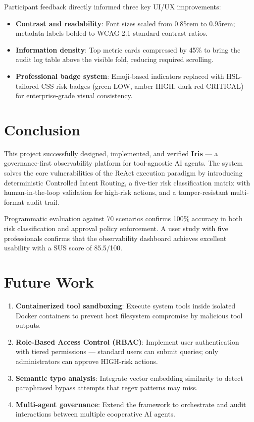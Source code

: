 Participant feedback directly informed three key UI/UX improvements:
\begin{itemize}[leftmargin=1.5em]
  \item \textbf{Contrast and readability}: Font sizes scaled from 0.85rem to 0.95rem; metadata labels bolded to WCAG 2.1 standard contrast ratios.
  \item \textbf{Information density}: Top metric cards compressed by 45\% to bring the audit log table above the visible fold, reducing required scrolling.
  \item \textbf{Professional badge system}: Emoji-based indicators replaced with HSL-tailored CSS risk badges (green LOW, amber HIGH, dark red CRITICAL) for enterprise-grade visual consistency.
\end{itemize}

\section{Conclusion}

This project successfully designed, implemented, and verified \textbf{Iris} — a governance-first observability platform for tool-agnostic AI agents. The system solves the core vulnerabilities of the ReAct execution paradigm by introducing deterministic Controlled Intent Routing, a five-tier risk classification matrix with human-in-the-loop validation for high-risk actions, and a tamper-resistant multi-format audit trail.

Programmatic evaluation against 70 scenarios confirms 100\% accuracy in both risk classification and approval policy enforcement. A user study with five professionals confirms that the observability dashboard achieves excellent usability with a SUS score of 85.5/100.

\section{Future Work}

\begin{enumerate}[leftmargin=1.5em]
  \item \textbf{Containerized tool sandboxing}: Execute system tools inside isolated Docker containers to prevent host filesystem compromise by malicious tool outputs.
  \item \textbf{Role-Based Access Control (RBAC)}: Implement user authentication with tiered permissions — standard users can submit queries; only administrators can approve HIGH-risk actions.
  \item \textbf{Semantic typo analysis}: Integrate vector embedding similarity to detect paraphrased bypass attempts that regex patterns may miss.
  \item \textbf{Multi-agent governance}: Extend the framework to orchestrate and audit interactions between multiple cooperative AI agents.
\end{enumerate}
